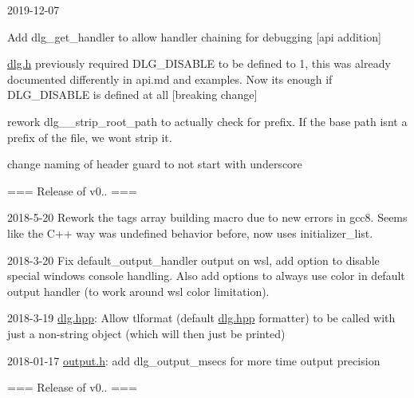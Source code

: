2019-\/12-\/07
\begin{DoxyItemize}
\item Add dlg\+\_\+get\+\_\+handler to allow handler chaining for debugging \mbox{[}api addition\mbox{]}
\item \mbox{\hyperlink{dlg_8h_source}{dlg.\+h}} previously required DLG\+\_\+\+DISABLE to be defined to 1, this was already documented differently in api.\+md and examples. Now it\textquotesingle{}s enough if DLG\+\_\+\+DISABLE is defined at all \mbox{[}breaking change\mbox{]}
\item rework dlg\+\_\+\+\_\+strip\+\_\+root\+\_\+path to actually check for prefix. If the base path isn\textquotesingle{}t a prefix of the file, we won\textquotesingle{}t strip it.
\item change naming of header guard to not start with underscore
\end{DoxyItemize}

=== Release of v0.. ===

2018-\/5-\/20 Rework the tags array building macro due to new errors in gcc8. Seems like the C++ way was undefined behavior before, now uses initializer\+\_\+list.

2018-\/3-\/20 Fix default\+\_\+output\+\_\+handler output on wsl, add option to disable special windows console handling. Also add options to always use color in default output handler (to work around wsl color limitation).

2018-\/3-\/19 \mbox{\hyperlink{dlg_8hpp_source}{dlg.\+hpp}}\+: Allow tlformat (default \mbox{\hyperlink{dlg_8hpp_source}{dlg.\+hpp}} formatter) to be called with just a non-\/string object (which will then just be printed)

2018-\/01-\/17 \mbox{\hyperlink{output_8h_source}{output.\+h}}\+: add dlg\+\_\+output\+\_\+msecs for more time output precision

=== Release of v0.. === 